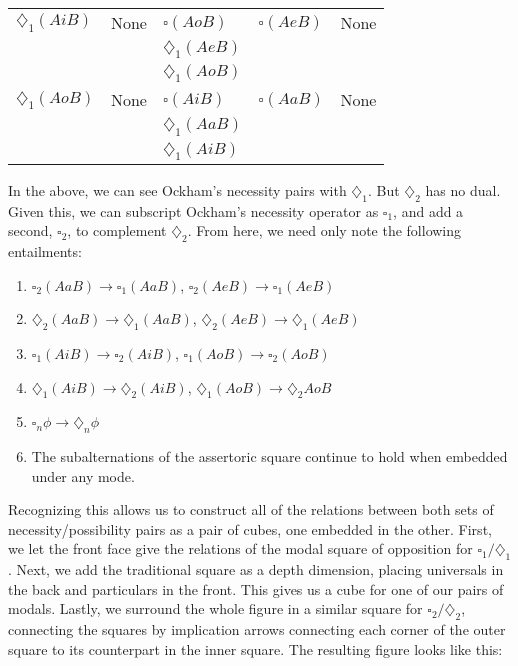 \begin{tabular}{|l|l|l|l|l|}
		$\diamondsuit_{1}(AiB)$ & None & $\square(AoB)$ & $\square(AeB)$ & None \\
		
		& & $\diamondsuit_{1}(AeB)$ & & \\
		
		& & $\diamondsuit_{1}(AoB)$ & & \\ \hline
		
		$\diamondsuit_{1}(AoB)$ & None & $\square(AiB)$ & $\square(AaB)$ & None \\
		
		& & $\diamondsuit_{1}(AaB)$ & & \\
		
		& & $\diamondsuit_{1}(AiB)$ & & \\ \hline
	\end{tabular}
	
	In the above, we can see Ockham's necessity pairs with $\diamondsuit_{1}$. But $\diamondsuit_{2}$ has no dual. Given this, we can subscript Ockham's necessity operator as $\square_{1}$, and add a second, $\square_{2}$, to complement $\diamondsuit_{2}$. From here, we need only note the following entailments:
	\begin{enumerate}
		\item $\square_{2}(AaB) \rightarrow \square_{1}(AaB)$, $\square_{2}(AeB) \rightarrow \square_{1}(AeB)$
		\item $\diamondsuit_{2}(AaB) \rightarrow \diamondsuit_{1}(AaB)$, $\diamondsuit_{2}(AeB) \rightarrow \diamondsuit_{1}(AeB)$
		\item $\square_{1}(AiB) \rightarrow \square_{2}(AiB)$, $\square_{1}(AoB) \rightarrow \square_{2}(AoB)$
		\item $\diamondsuit_{1}(AiB) \rightarrow \diamondsuit_{2}(AiB)$, $\diamondsuit_{1}(AoB) \rightarrow \diamondsuit_{2}AoB$ 
		\item $\square_{n}\phi \rightarrow \diamondsuit_{n}\phi$
		\item The subalternations of the assertoric square continue to hold when embedded under any mode. 
	\end{enumerate}
	\noindent Recognizing this allows us to construct all of the relations between both sets of necessity/possibility pairs as a pair of cubes, one embedded in the other. First, we let the front face give the relations of the modal square of opposition for $\square_{1}/\diamondsuit_{1}$. Next, we add the traditional square as a depth dimension, placing universals in the back and particulars in the front. This gives us a cube for one of our pairs of modals. Lastly, we surround the whole figure in a similar square for $\square_{2}/\diamondsuit_{2}$, connecting the squares by implication arrows connecting each corner of the outer square to its counterpart in the inner square. The resulting figure looks like this:
	
